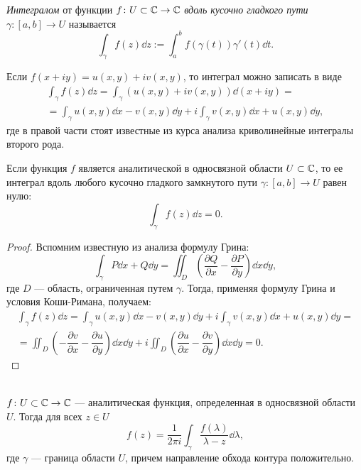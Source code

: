 \begin{definition}
    \emph{Интегралом} от функции $f \colon U \subset \mathbb{C} \to \mathbb{C}$ \emph{вдоль
        кусочно гладкого пути} $\gamma \colon [a, b] \to U$ называется 
    \[ \int_\gamma f(z) \dd z := \int_a^b f(\gamma(t)) \gamma'(t) \dd t. \]
\end{definition}

Если $f(x + i y) = u(x, y) + i v(x, y)$, то интеграл можно записать в виде
\begin{multline*}
 \int_\gamma f(z) \dd z = \int_\gamma (u(x, y) + i v(x, y)) \dd (x + i y) =\\ = 
   \int_\gamma u(x, y) \dd x - v(x, y) \dd y + i \int_\gamma v(x, y) \dd x + u(x, y) \dd y, 
\end{multline*}
где в правой части стоят известные из курса анализа криволинейные интегралы второго рода.

\begin{theorem}[Коши]
    Если функция $f$ является аналитической в односвязной области $U \subset \mathbb{C}$,
    то ее интеграл вдоль любого кусочно гладкого замкнутого 
    пути $\gamma \colon [a, b] \to U$ равен нулю:
    \[ \int_{\gamma} f(z) \dd z = 0. \]
\end{theorem}

\begin{proof}
    Вспомним известную из анализа формулу Грина:
    \[ \int_\gamma P \dd x + Q \dd y = \iint_D \left(\dfrac{\partial Q}{\partial x} - \dfrac{\partial P}{\partial y}\right) \dd x \dd y, \]
    где $D$ --- область, ограниченная путем $\gamma$.
    Тогда, применяя формулу Грина и условия Коши-Римана, получаем:
    \begin{multline*}
     \int_\gamma f(z) \dd z =  
       \int_\gamma u(x, y) \dd x - v(x, y) \dd y + i \int_\gamma v(x, y) \dd x + u(x, y) \dd y = \\ = \iint_D \left(-\dfrac{\partial v}{\partial x} - \dfrac{\partial u}{\partial y}\right) \dd x \dd y + i \iint_D \left(\dfrac{\partial u}{\partial x} - \dfrac{\partial v}{\partial y}\right) \dd x \dd y = 0.
    \end{multline*}
\end{proof}

\begin{theorem}\label{th:cauchy_formula}\hfill\\
     $f \colon U \subset \mathbb{C} \to \mathbb{C}$ --- аналитическая функция, определенная
    в односвязной области $U$. Тогда для всех $z \in U$
    \[ f(z) = \frac{1}{2 \pi i} \int_\gamma \frac{f(\lambda)}{\lambda - z} \dd \lambda, \]
    где $\gamma$ --- граница области $U$, причем направление обхода контура положительно.
\end{theorem}

